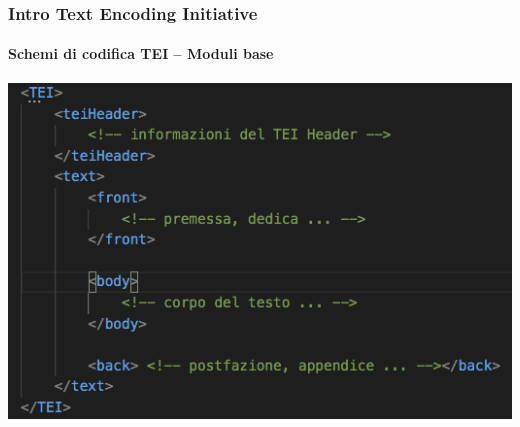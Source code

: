 \begin{frame}
	\frametitle{Intro Text Encoding Initiative}
	\framesubtitle{Schemi di codifica TEI – Moduli base}
	\addtocounter{nframe}{1}


	\begin{center}
		\includegraphics[width=.95\textwidth]{imgs/esempio3.png}
	\end{center}

    
   

\end{frame}





